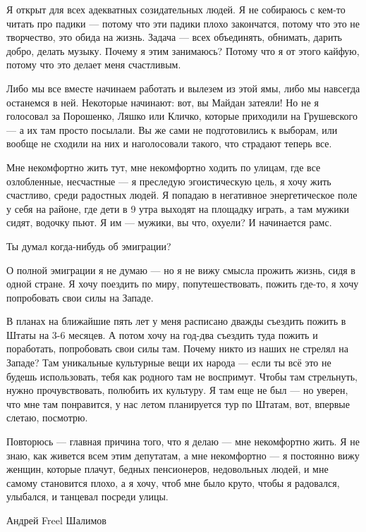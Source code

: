 Я открыт для всех адекватных созидательных людей. Я не собираюсь с кем-то
читать про падики --- потому что эти падики плохо закончатся, потому что это не
творчество, это обида на жизнь. Задача --- всех объединять, обнимать, дарить
добро, делать музыку. Почему я этим занимаюсь? Потому что я от этого кайфую,
потому что это делает меня счастливым.

Либо мы все вместе начинаем работать и вылезем из этой ямы, либо мы навсегда
останемся в ней. Некоторые начинают: вот, вы Майдан затеяли! Но не я голосовал
за Порошенко, Ляшко или Кличко, которые приходили на Грушевского --- а их там
просто посылали. Вы же сами не подготовились к выборам, или вообще не сходили
на них и наголосовали такого, что страдают теперь все.

Мне некомфортно жить тут, мне некомфортно ходить по улицам, где все
озлобленные, несчастные --- я преследую эгоистическую цель, я хочу жить
счастливо, среди радостных людей. Я попадаю в негативное энергетическое  поле у
себя на районе, где дети в 9 утра выходят на площадку играть, а там мужики
сидят, водочку пьют. Я им --- мужики, вы что, охуели? И начинается рамс.

Ты думал когда-нибудь об эмиграции?

О полной эмиграции я не думаю --- но я не вижу смысла прожить жизнь, сидя в одной
стране. Я хочу поездить по миру, попутешествовать, пожить где-то, я хочу
попробовать свои силы на Западе.

В планах на ближайшие пять лет у меня расписано дважды съездить пожить в Штаты
на 3-6 месяцев. А потом хочу на год-два съездить туда пожить и поработать,
попробовать свои силы там. Почему никто из наших не стрелял на Западе? Там
уникальные культурные вещи их народа --- если ты всё это не будешь использовать,
тебя как родного там не воспримут. Чтобы там стрельнуть, нужно прочувствовать,
полюбить их культуру. Я там еще не был --- но уверен, что мне там понравится, у
нас летом планируется тур по Штатам, вот, впервые слетаю, посмотрю.

Повторюсь --- главная причина того, что я делаю --- мне некомфортно жить.  Я не
знаю, как живется всем этим депутатам, а мне некомфортно --- я постоянно вижу
женщин, которые плачут, бедных пенсионеров, недовольных людей, и мне самому
становится плохо, а я хочу, чтоб мне было круто, чтобы я радовался, улыбался, и
танцевал посреди улицы. 

Андрей Freel Шалимов
